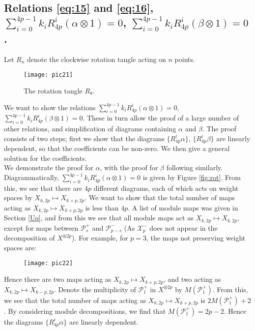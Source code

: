 \documentclass[]{article}
\begin{document}
\subsection{Relations \ref{eq:15} and \ref{eq:16}, $\sum\limits_{i=0}^{4p-1} k_{i}R^{i}_{4p}(\alpha\otimes 1)=0$, $\sum\limits_{i=0}^{4p-1} k_{i}R^{i}_{4p}(\beta\otimes 1)=0$.}
Let $R_{n}$ denote the clockwise rotation tangle acting on $n$ points.
\begin{figure}[H]
	\centering
	\texttt{[image: pic21]}
	\caption{The rotation tangle $R_{8}$.}
\end{figure}
We want to show the relations $\sum\limits_{i=0}^{4p-1} k_{i}R^{i}_{4p}(\alpha\otimes 1)=0$, $\sum\limits_{i=0}^{4p-1} k_{i}R^{i}_{4p}(\beta\otimes 1)=0$. These in turn allow the proof of a large number of other relations, and simplification of diagrams containing $\alpha$ and $\beta$. The proof consists of two steps; first we show that the diagrams $\{R_{4p}^{i}\alpha\}$, $\{R^{i}_{4p}\beta\}$ are linearly dependent, so that the coefficients can be non-zero. We then give a general solution for the coefficients.\\

We demonstrate the proof for $\alpha$, with the proof for $\beta$ following similarly. Diagrammatically, $\sum\limits_{i=0}^{4p-1} k_{i}R^{i}_{4p}(\alpha\otimes 1)=0$ is given by Figure \ref{fig:rot}. From this, we see that there are $4p$ different diagrams, each of which acts on weight spaces by $X_{k,2p}\mapsto X_{k+p,2p}$. We want to show that the total number of maps acting as $X_{k,2p}\mapsto X_{k+p,2p}$ is less than $4p$. A list of module maps was given in Section \ref{Uq}, and from this we see that all module maps act as $X_{k,2p}\mapsto X_{k,2p}$, except for maps between $\mathcal{P}^{+}_{s}$ and $\mathcal{P}^{-}_{p-s}$ (As $\mathcal{X}^{-}_{p}$ does not appear in the decomposition of $X^{\otimes 2p}$). For example, for $p=3$, the maps not preserving weight spaces are:
\begin{figure}[H]
	\centering
	\texttt{[image: pic22]}
\end{figure}
Hence there are two maps acting as $X_{k,2p}\mapsto X_{k+p,2p}$, and two acting as $X_{k,2p}\mapsto X_{k-p,2p}$. Denote the multiplicity of $\mathcal{P}^{+}_{1}$ in $X^{\otimes 2p}$ by $M(\mathcal{P}^{+}_{1})$. From this, we see that the total number of maps acting as $X_{k,2p}\mapsto X_{k+p,2p}$ is $2M(\mathcal{P}^{+}_{1})+2$. By considering module decompositions, we find that $M(\mathcal{P}^{+}_{1})=2p-2$. Hence the diagrams $\{R_{4p}^{i}\alpha\}$ are linearly dependent.\\
\end{document}
